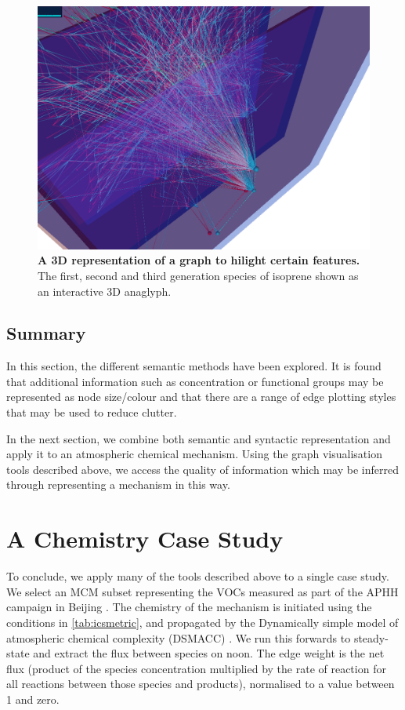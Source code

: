 \begin{figure}[H]
     \centering
     \includegraphics[width=.6\textwidth]{figures_c1/layout/3D.png}
        \caption{\textbf{A 3D representation of a graph to hilight certain features.} The first, second and third generation species of isoprene shown as an interactive 3D anaglyph. }
      \label{fig:3D}
\end{figure}

\subsection{Summary}
In this section, the different semantic methods have been explored. It is found that additional information such as concentration or functional groups may be represented as node size/colour and that there are a range of edge plotting styles that may be used to reduce clutter. 

In the next section, we combine both semantic and syntactic representation and apply it to an atmospheric chemical mechanism. Using the graph visualisation tools described above, we access the quality of information which may be inferred through representing a mechanism in this way.


\section{A Chemistry Case Study}\label{sec:chemcase}
To conclude, we apply many of the tools described above to a single case study. We select an MCM subset representing the VOCs measured as part of the APHH campaign in Beijing \citep{aphh}. The chemistry of the mechanism is initiated using the conditions in \autoref{tab:icsmetric}, and propagated by the Dynamically simple model of atmospheric chemical complexity (DSMACC) \citep{dsmacc,dsmaccgit}. We run this forwards to steady-state and extract the flux between species on noon. The edge weight is the net flux (product of the species concentration multiplied by the rate of reaction for all reactions between those species and products), normalised to a value between 1 and zero. 

